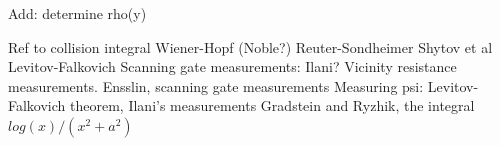 \documentclass[preprint,aps,eqsecnum]{revtex4-1}
\begin{document}
Add: determine rho(y)

\begin{thebibliography}{99}
 Ref to collision integral
 Wiener-Hopf (Noble?)
 Reuter-Sondheimer
 Shytov et al
 Levitov-Falkovich
 Scanning gate measurements: Ilani?
 Vicinity resistance measurements.
 Ensslin, scanning gate measurements
 Measuring psi: Levitov-Falkovich theorem,
  Ilani's measurements
 Gradstein and Ryzhik, the integral $log(x)/(x^2 + a^2)$
\end{thebibliography}
\end{document}
